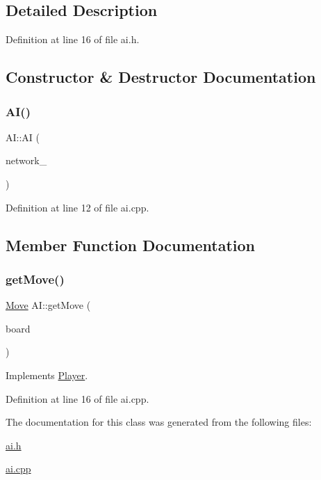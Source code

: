 \subsection{Detailed Description}


Definition at line 16 of file ai.\+h.



\subsection{Constructor \& Destructor Documentation}
\mbox{\label{class_a_i_a24760cc7163907dee1ff7ec9df8fa7af}} 
\subsubsection{\texorpdfstring{A\+I()}{AI()}}
{\footnotesize\ttfamily A\+I\+::\+AI (\begin{DoxyParamCaption}\item[{const \hyperlink{ai_8h_aafca5132d037883f5cd25160f7ccdc0d}{Neural\+Network\+Ptr}}]{network\+\_\+ }\end{DoxyParamCaption})}



Definition at line 12 of file ai.\+cpp.



\subsection{Member Function Documentation}
\mbox{\label{class_a_i_a2d1a6ed520e3b3ada7133bd03d405d6d}} 
\subsubsection{\texorpdfstring{get\+Move()}{getMove()}}
{\footnotesize\ttfamily \hyperlink{struct_move}{Move} A\+I\+::get\+Move (\begin{DoxyParamCaption}\item[{\hyperlink{constants_8h_af901d0acc1572fb0c779f84ddd2c6ce8}{Board}}]{board }\end{DoxyParamCaption})\hspace{0.3cm}{\ttfamily [virtual]}}



Implements \hyperlink{class_player_a97a516ce71ccef14123884b562c90e4c}{Player}.



Definition at line 16 of file ai.\+cpp.



The documentation for this class was generated from the following files\+:\begin{DoxyCompactItemize}
\item 
\hyperlink{ai_8h}{ai.\+h}\item 
\hyperlink{ai_8cpp}{ai.\+cpp}\end{DoxyCompactItemize}
